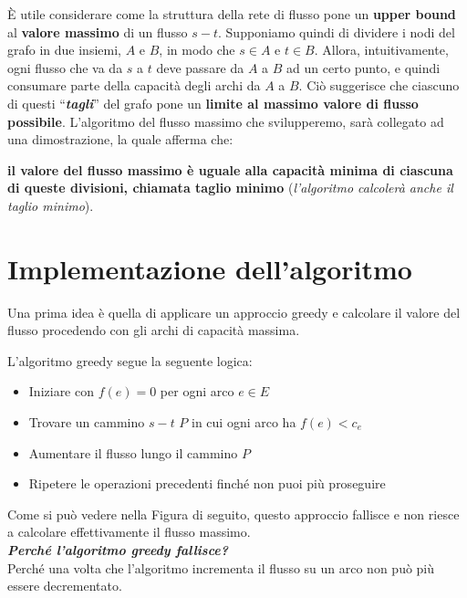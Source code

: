 È utile considerare come la struttura della rete di flusso pone un
\textbf{upper bound} al \textbf{valore massimo} di un flusso $s-t$.
Supponiamo quindi di dividere i nodi del grafo in due insiemi, $A$ e
$B$, in modo che $s \in A$ e $t \in B$. Allora, intuitivamente,
ogni flusso che va da $s$ a $t$ deve passare da $A$ a $B$ ad un
certo punto, e quindi consumare parte della capacità degli archi da
$A$ a $B$. Ciò suggerisce che ciascuno di questi
``\textbf{\emph{tagli}}'' del grafo pone un \textbf{limite al massimo
  valore di flusso possibile}. L'algoritmo del flusso massimo che
svilupperemo, sarà collegato ad una dimostrazione, la quale afferma che:
\begin{myblockquote}
  \textbf{il valore del flusso massimo è uguale alla
    capacità minima di ciascuna di queste divisioni, chiamata taglio minimo}
  (\emph{l'algoritmo calcolerà anche il taglio minimo}).
\end{myblockquote}



\section{Implementazione dell'algoritmo}

Una prima idea è quella di applicare un approccio greedy e calcolare il
valore del flusso procedendo con gli archi di capacità massima.

L'algoritmo greedy segue la seguente logica:
\begin{itemize}
  \item Iniziare con $f(e) = 0$ per ogni arco $e \in E$
  \item Trovare un cammino $s-t$ $P$ in cui ogni arco ha $f(e) < c_e$
  \item Aumentare il flusso lungo il cammino $P$
  \item Ripetere le operazioni precedenti finché non puoi più proseguire
\end{itemize}

Come si può vedere nella Figura di seguito, questo approccio fallisce e
non riesce a calcolare effettivamente il flusso massimo.\\

\textbf{\emph{Perché l'algoritmo greedy fallisce?}}\\
Perché una volta che l'algoritmo incrementa il flusso su un arco non
può più essere decrementato.

